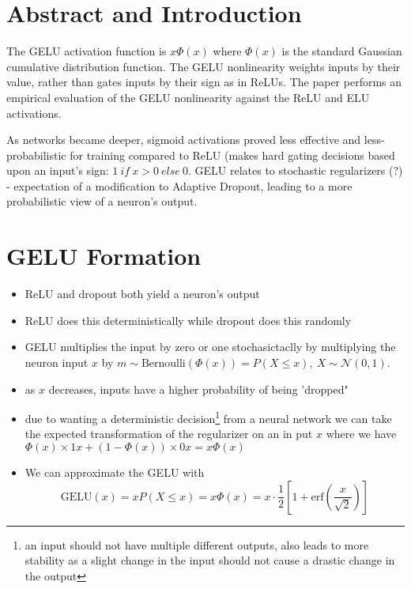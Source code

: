 
\section{Abstract and Introduction}

The GELU activation function is \(x\Phi(x)\) where \(\Phi(x)\) is the standard Gaussian cumulative distribution function. The GELU nonlinearity weights inputs by their value, rather than gates inputs by their sign as in ReLUs. The paper performs an empirical evaluation of the GELU nonlinearity against the ReLU and ELU activations.

\text{\newline}

As networks became deeper, sigmoid activations proved less effective and less-probabilistic for training compared to ReLU (makes hard gating decisions based upon an input's sign: \(1\ if\ x > 0\ else\ 0\). GELU relates to stochastic regularizers (?) - expectation of a modification to Adaptive Dropout, leading to a more probabilistic view of a neuron's output.


\section{GELU Formation}

\begin{itemize}
    \item ReLU and dropout both yield a neuron's output
    \item ReLU does this deterministically while dropout does this randomly
    \item GELU multiplies the input by zero or one stochasictaclly by multiplying the neuron input $x$ by \(m\sim \text{Bernoulli}(\Phi(x))=P(X \leq x),\ X \sim \mathcal{N}(0,1)\).
    \item as $x$ decreases, inputs have a higher probability of being 'dropped"
    \item due to wanting a deterministic decision\footnote{an input should not have multiple different outputs, also leads to more stability as a slight change in the input should not cause a drastic change in the output} from a neural network we can take the expected transformation of the regularizer on an in put $x$ where we have \(\Phi(x) \times 1x + (1 - \Phi(x))\times 0x = x\Phi(x)\)
    \item We can approximate the GELU with
        \[
            \text{GELU}(x) = xP(X \leq x) = x\Phi(x) = x \cdot \frac{1}{2}\left [1 + \text{erf}\left(\frac{x}{\sqrt{2}}\right) \right]
        \]
\end{itemize}

